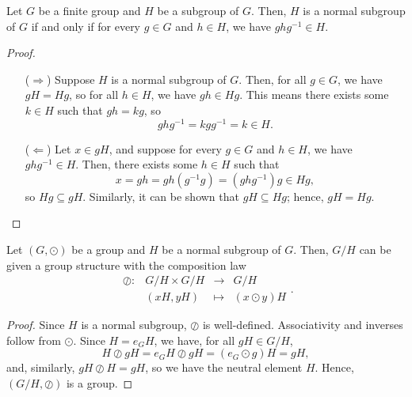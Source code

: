 \begin{prop}\label{prop:normal_subgroup}
Let $ G $ be a finite group and $ H $ be a subgroup of $ G $. Then, $ H $ is a normal subgroup of $ G $ if and only if for every $ g\in G $ and $ h\in H $, we have $ ghg^{-1}\in H $.
\end{prop}
\begin{proof}~
\begin{enumerate}

\item[($ \Rightarrow $)] Suppose $ H $ is a normal subgroup of $ G $. Then, for all $ g\in G $, we have $ gH=Hg $, so for all $ h\in H $, we have $ gh\in Hg $. This means there exists some $ k\in H $ such that $ gh=kg $, so
\begin{equation*}
    ghg^{-1}=kgg^{-1}=k\in H.
\end{equation*}

\item[($ \Leftarrow $)] Let $ x\in gH $, and suppose for every $ g\in G $ and $ h\in H $, we have $ ghg^{-1}\in H $. Then, there exists some $ h\in H $ such that
\begin{equation*}
    x=gh=gh(g^{-1}g)=(ghg^{-1})g\in Hg,
\end{equation*}
so $ Hg\subseteq gH $. Similarly, it can be shown that $ gH\subseteq Hg $; hence, $ gH=Hg $. \qedhere

\end{enumerate}
\end{proof}

\begin{thm}
Let $ (G,\odot) $ be a group and $ H $ be a normal subgroup of $ G $. Then, $ G/H $ can be given a group structure with the composition law
\begin{equation*}
    \begin{array}{rccc}
        \oslash: & G/H\times G/H & \to & G/H \\
        & (xH,yH) & \mapsto & (x\odot y)H
    \end{array}.
\end{equation*}
\end{thm}
\begin{proof}
Since $ H $  is a normal subgroup, $ \oslash $ is well-defined. Associativity and inverses follow from $ \odot $. Since $ H=e_GH $, we have, for all $ gH\in G/H $,
\begin{equation*}
    H\oslash gH=e_GH\oslash gH=(e_G\odot g)H=gH,
\end{equation*}
and, similarly, $ gH\oslash H=gH $, so we have the neutral element $ H $. Hence, $ (G/H,\oslash) $ is a group.
\end{proof}

